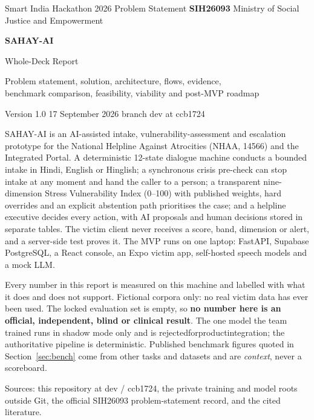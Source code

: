\documentclass[11pt,a4paper]{article}
\newcommand{\codeus}{\textunderscore\allowbreak}
\DeclareRobustCommand{\code}[1]{{\ttfamily\let\_\codeus #1}}
\begin{document}

\begin{titlepage}
\centering
{\small\color{sahaygray} Smart India Hackathon 2026 \textbullet{} Problem Statement \textbf{SIH26093} \textbullet{} Ministry of Social Justice and Empowerment\par}
\vspace{2.0cm}
{\fontsize{34}{40}\selectfont\bfseries\color{sahayblue} SAHAY-AI\par}
\vspace{0.45cm}
{\LARGE Whole-Deck Report\par}
\vspace{0.25cm}
{\large Problem statement, solution, architecture, flows, evidence,\\[2pt]
benchmark comparison, feasibility, viability and post-MVP roadmap\par}
\vspace{0.9cm}
{\large Version 1.0 \textbullet{} 17 September 2026 \textbullet{} branch \code{dev} at \code{ccb1724}\par}
\vspace{1.3cm}
\begin{keybox}[title={The one-paragraph version}]
\small
SAHAY-AI is an AI-assisted intake, vulnerability-assessment and escalation prototype for the
National Helpline Against Atrocities (NHAA, 14566) and the Integrated Portal. A deterministic
12-state dialogue machine conducts a bounded intake in Hindi, English or Hinglish; a synchronous
crisis pre-check can stop intake at any moment and hand the caller to a person; a transparent
nine-dimension Stress Vulnerability Index (0--100) with published weights, hard overrides and an
explicit abstention path prioritises the case; and a helpline executive decides every action, with
AI proposals and human decisions stored in separate tables. The victim client never receives a
score, band, dimension or alert, and a server-side test proves it. The MVP runs on one laptop:
FastAPI, Supabase PostgreSQL, a React console, an Expo victim app, self-hosted speech models and a
mock LLM.
\end{keybox}
\vspace{0.4cm}
\begin{warnbox}[title={Evidence standard used throughout}]
\small
Every number in this report is measured on this machine and labelled with what it does and does not
support. Fictional corpora only: no real victim data has ever been used. The locked evaluation set
is empty, so \textbf{no number here is an official, independent, blind or clinical result}. The one
model the team trained runs in shadow mode only and is \code{rejected\_for\_product\_integration};
the authoritative pipeline is deterministic. Published benchmark figures quoted in
Section~\ref{sec:bench} come from other tasks and datasets and are \emph{context}, never a scoreboard.
\end{warnbox}
\vfill
{\small\color{sahaygray} Sources: this repository at \code{dev} / \code{ccb1724}, the private training and
model roots outside Git, the official SIH26093 problem-statement record, and the cited literature.\par}
\end{titlepage}
\end{document}
